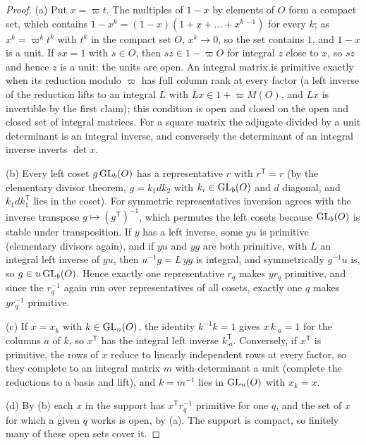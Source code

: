 \begin{proof}
(a) Put $x=\varpi t$. The multiples of $1-x$ by elements of $O$ form a compact set, which contains $1-x^k=(1-x)(1+x+\dots+x^{k-1})$ for every $k$; as $x^k=\varpi^kt^k$ with $t^k$ in the compact set $O$,
$x^k\to0$, so the set contains $1$, and $1-x$ is a unit. If $sx=1$ with $s\in O$, then $sz\in1-\varpi O$ for integral $z$ close to $x$, so $sz$ and hence $z$ is a unit: the units are open. An integral matrix
is primitive exactly when its reduction modulo $\varpi$ has full column rank at every factor (a left inverse of the reduction lifts to an integral $L$ with $Lx\in1+\varpi M(O)$, and $Lx$ is invertible by the
first claim); this condition is open and closed on the open and closed set of integral matrices. For a square matrix the adjugate divided by a unit determinant is an integral inverse, and conversely
the determinant of an integral inverse inverts $\det x$.

(b) Every left coset $g\operatorname{GL}_b(O)$ has a representative $r$ with $r^{\mathsf T}=r$ (by the elementary divisor theorem, $g=k_1dk_2$ with $k_i\in\operatorname{GL}_b(O)$ and $d$ diagonal, and $k_1dk_1^{\mathsf T}$ lies in the
coset). For symmetric representatives inversion agrees with the inverse transpose $g\mapsto(g^{\mathsf T})^{-1}$, which permutes the left cosets because $\operatorname{GL}_b(O)$ is stable under transposition. If $y$ has a left
inverse, some $yu$ is primitive (elementary divisors again), and if $yu$ and $yg$ are both primitive, with $L$ an integral left inverse of $yu$, then $u^{-1}g=L\,yg$ is integral, and symmetrically
$g^{-1}u$ is, so $g\in u\operatorname{GL}_b(O)$. Hence exactly one representative $r_q$ makes $yr_q$ primitive, and since the $r_q^{-1}$ again run over representatives of all cosets, exactly one $q$ makes $yr_q^{-1}$ primitive.

(c) If $x=x_k$ with $k\in\operatorname{GL}_n(O)$, the identity $k^{-1}k=1$ gives $x\,k_{\cdot a}=1$ for the columns $a$ of $k$, so $x^{\mathsf T}$ has the integral left inverse $k_{\cdot a}^{\mathsf T}$. Conversely, if
$x^{\mathsf T}$ is primitive, the rows of $x$ reduce to linearly independent rows at every factor, so they complete to an integral matrix $m$ with determinant a unit (complete the reductions to a basis and
lift), and $k=m^{-1}$ lies in $\operatorname{GL}_n(O)$ with $x_k=x$.

(d) By (b) each $x$ in the support has $x^{\mathsf T}r_q^{-1}$ primitive for one $q$, and the set of $x$ for which a given $q$ works is open, by (a). The support is compact, so finitely many of these open
sets cover it.
\end{proof}

